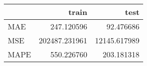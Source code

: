 \begin{tabular}{lrr}
\toprule
{} &          train &          test \\
\midrule
MAE  &     247.120596 &     92.476686 \\
MSE  &  202487.231961 &  12145.617989 \\
MAPE &     550.226760 &    203.181318 \\
\bottomrule
\end{tabular}
